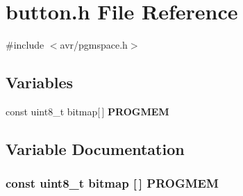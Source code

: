 \section{button.h File Reference}
\label{button_8h}
{\ttfamily \#include $<$avr/pgmspace.h$>$}\par
\subsection*{Variables}
\begin{DoxyCompactItemize}
\item 
const uint8\_\-t bitmap[$\,$] {\bf PROGMEM}
\end{DoxyCompactItemize}


\subsection{Variable Documentation}
\subsubsection[{PROGMEM}]{\setlength{\rightskip}{0pt plus 5cm}const uint8\_\-t bitmap [$\,$] {\bf PROGMEM}}\label{button_8h_a1ca6393a353d3dde5511786a4d7cc139}
